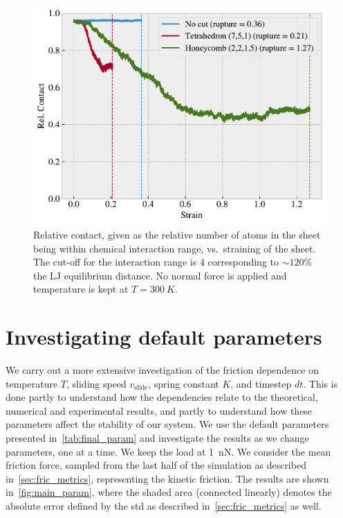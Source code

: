 \begin{figure}[H]
  \centering
  \includegraphics[width=0.6\linewidth]{figures/baseline/contact_vs_stretch.pdf}
  \caption{Relative contact, given as the relative number of atoms in the sheet being within chemical interaction range, vs.\ straining of the sheet. The cut-off for the interaction range is \SI{4}{} corresponding to $\sim 120 \%$ the \acrshort{LJ} equilibrium distance. No normal force is applied and temperature is kept at $T = \SI{300}{K}$.}
  \label{fig:contact_vs_stretch}
\end{figure}




\section{Investigating default parameters}\label{sec:main_params}
We carry out a more extensive investigation of the friction dependence on temperature $T$, sliding speed $v_{\text{slide}}$, spring
constant $K$, and timestep $dt$. This is done partly to
understand how the dependencies relate to the theoretical, numerical and
experimental results, and partly to understand how these parameters affect
the stability of our system. We use the default parameters presented in~\cref{tab:final_param} and investigate the results as we change parameters, one at a time. We keep the load at \SI{1}{nN}. We consider the mean
friction force, sampled from the last half of the simulation as described in~\cref{sec:fric_metrics}, representing the kinetic friction. The results are shown in~\cref{fig:main_param}, where the shaded area (connected linearly) denotes the absolute error defined by the \acrshort{std} as described in~\cref{sec:fric_metrics} as well. 

